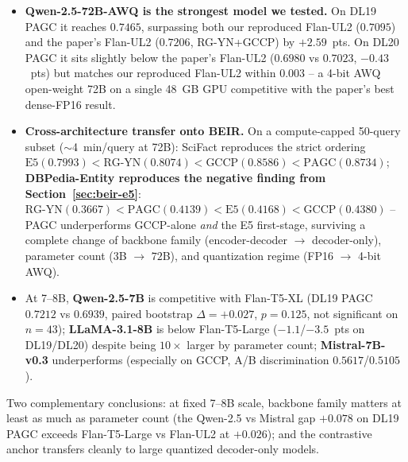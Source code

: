 \documentclass[sigconf]{acmart}
\begin{document}
\begin{itemize}[leftmargin=1.5em,nosep]
    \item \textbf{Qwen-2.5-72B-AWQ is the strongest model we
          tested.} On DL19 PAGC it reaches $0.7465$, surpassing
          both our reproduced Flan-UL2 ($0.7095$) and the paper's
          Flan-UL2 ($0.7206$, RG-YN+GCCP) by $+2.59$~pts. On DL20
          PAGC it sits slightly below the paper's Flan-UL2
          ($0.6980$ vs $0.7023$, $-0.43$~pts) but matches our
          reproduced Flan-UL2 within $0.003$ -- a 4-bit AWQ
          open-weight 72B on a single 48~GB GPU competitive with
          the paper's best dense-FP16 result.
    \item \textbf{Cross-architecture transfer onto BEIR.} On a
          compute-capped 50-query subset ($\sim$4~min/query at 72B):
          SciFact reproduces the strict ordering
          $\text{E5}(0.7993) < \text{RG-YN}(0.8074) <
          \text{GCCP}(0.8586) < \text{PAGC}(\mathbf{0.8734})$;
          \textbf{DBPedia-Entity reproduces the negative finding from
          Section~\ref{sec:beir-e5}}:
          $\text{RG-YN}(0.3667) < \text{PAGC}(0.4139) <
          \text{E5}(0.4168) < \text{GCCP}(\mathbf{0.4380})$ -- PAGC
          underperforms GCCP-alone \emph{and} the E5 first-stage,
          surviving a complete change of backbone family
          (encoder-decoder $\to$ decoder-only), parameter count
          ($3$B $\to$ $72$B), and quantization regime
          (FP16 $\to$ 4-bit AWQ).
    \item At 7--8B, \textbf{Qwen-2.5-7B} is competitive with
          Flan-T5-XL (DL19 PAGC $0.7212$ vs $0.6939$, paired
          bootstrap $\Delta{=}{+}0.027$, $p{=}0.125$, not significant
          on $n{=}43$); \textbf{LLaMA-3.1-8B} is below Flan-T5-Large
          ($-1.1$/$-3.5$~pts on DL19/DL20) despite being $10\times$
          larger by parameter count; \textbf{Mistral-7B-v0.3}
          underperforms (especially on GCCP, A/B discrimination
          $0.5617$/$0.5105$).
\end{itemize}

\noindent Two complementary conclusions: at fixed 7--8B scale,
backbone family matters at least as much as parameter count (the
Qwen-2.5 vs Mistral gap $+0.078$ on DL19 PAGC exceeds Flan-T5-Large
vs Flan-UL2 at $+0.026$); and the contrastive anchor transfers
cleanly to large quantized decoder-only models.
\end{document}
